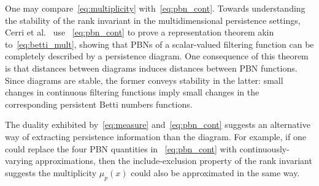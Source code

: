 One may compare~\eqref{eq:multiplicity} with~\eqref{eq:pbn_cont}. Towards understanding the stability of the rank invariant in the multidimensional persistence settings, Cerri et al.~\cite{cerri2013betti} use ~\eqref{eq:pbn_cont} to prove a representation theorem akin to~\eqref{eq:betti_mult}, showing that PBNs of a scalar-valued filtering function can be completely described by a persistence diagram. 
One consequence of this theorem is that distances between diagrams induces distances between PBN functions. Since diagrams are stable, the former conveys stability in the latter: small changes in continuous filtering functions imply small changes in the corresponding persistent Betti numbers functions.  

The duality exhibited by~\eqref{eq:measure} and~\eqref{eq:pbn_cont} suggests an alternative way of extracting persistence information than the diagram. For example, if one could replace the four PBN quantities  in ~\eqref{eq:pbn_cont} with continuously-varying approximations, then the include-exclusion property of the rank invariant suggests the multiplicity $\mu_p(x)$ could also be approximated in the same way. 





